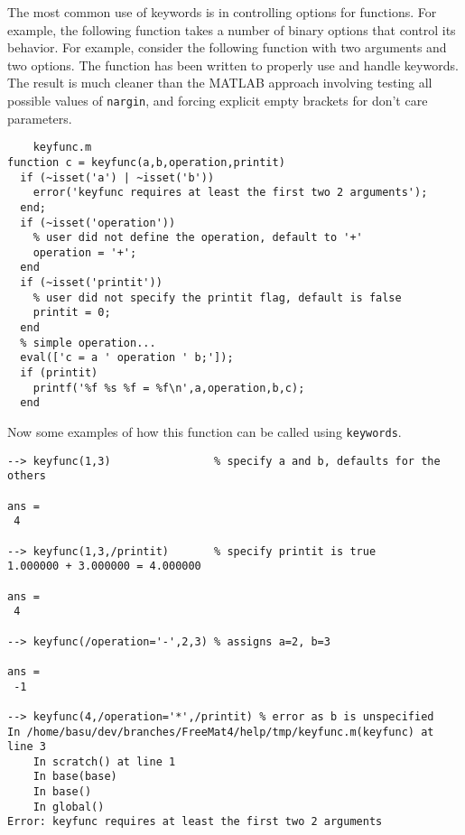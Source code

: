The most common use of keywords is in controlling options for
functions.  For example, the following function takes a number
of binary options that control its behavior.  For example,
consider the following function with two arguments and two
options.  The function has been written to properly use and
handle keywords.  The result is much cleaner than the MATLAB
approach involving testing all possible values of \verb|nargin|,
and forcing explicit empty brackets for don't care parameters.
\begin{verbatim}
    keyfunc.m
function c = keyfunc(a,b,operation,printit)
  if (~isset('a') | ~isset('b')) 
    error('keyfunc requires at least the first two 2 arguments'); 
  end;
  if (~isset('operation'))
    % user did not define the operation, default to '+'
    operation = '+';
  end
  if (~isset('printit'))
    % user did not specify the printit flag, default is false
    printit = 0;
  end
  % simple operation...
  eval(['c = a ' operation ' b;']);
  if (printit) 
    printf('%f %s %f = %f\n',a,operation,b,c);
  end
\end{verbatim}
Now some examples of how this function can be called using
\verb|keywords|.
\begin{verbatim}
--> keyfunc(1,3)                % specify a and b, defaults for the others

ans = 
 4 

--> keyfunc(1,3,/printit)       % specify printit is true
1.000000 + 3.000000 = 4.000000

ans = 
 4 

--> keyfunc(/operation='-',2,3) % assigns a=2, b=3

ans = 
 -1 

--> keyfunc(4,/operation='*',/printit) % error as b is unspecified
In /home/basu/dev/branches/FreeMat4/help/tmp/keyfunc.m(keyfunc) at line 3
    In scratch() at line 1
    In base(base)
    In base()
    In global()
Error: keyfunc requires at least the first two 2 arguments
\end{verbatim}
